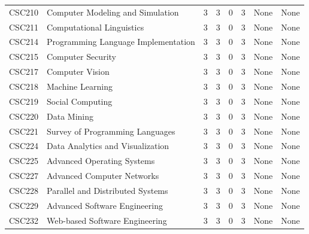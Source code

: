 \documentclass[11pt,a4paper]{article}
\begin{document}
{\begin{tabular}{p{.65in}L{2in}ccccp{.65in}p{.65in}}
CSC210 & Computer Modeling and Simulation      & 3          & 3   &  0  &  3    & None & None \\
CSC211 & Computational Linguistics             & 3          & 3   &  0  &  3    & None & None \\
CSC214 & Programming Language Implementation   & 3          & 3   &  0  &  3    & None & None \\
CSC215 & Computer Security                     & 3          & 3   &  0  &  3    & None & None \\
CSC217 & Computer Vision                       & 3          & 3   &  0  &  3    & None & None \\
CSC218 & Machine Learning                      & 3          & 3   &  0  &  3    & None & None \\
CSC219 & Social Computing                      & 3          & 3   &  0  &  3    & None & None \\
CSC220 & Data Mining                           & 3          & 3   &  0  &  3    & None & None \\
CSC221 & Survey of Programming Languages       & 3          & 3   &  0  &  3    & None & None \\
CSC224 & Data Analytics and Visualization      & 3          & 3   &  0  &  3    & None & None \\
CSC225 & Advanced Operating Systems            & 3          & 3   &  0  &  3    & None & None \\
CSC227 & Advanced Computer Networks            & 3          & 3   &  0  &  3    & None & None \\
CSC228 & Parallel and Distributed Systems      & 3          & 3   &  0  &  3    & None & None \\
CSC229 & Advanced Software Engineering         & 3          & 3   &  0  &  3    & None & None \\
CSC232 & Web-based Software Engineering        & 3          & 3   &  0  &  3    & None & None \\

\end{tabular}}
\end{document}
